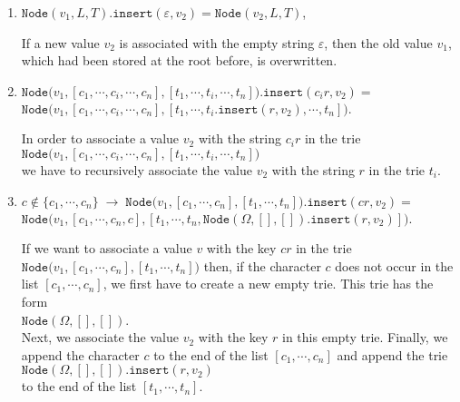 \begin{enumerate}
\item $\texttt{Node}(v_1,L,T).\texttt{insert}(\varepsilon, v_2) = \texttt{Node}(v_2,L,T)$,
  
      If a new value $v_2$ is associated with the empty string $\varepsilon$, then the old value
      $v_1$, which had been stored at the root before, is overwritten.
\item $\texttt{Node}\bigl(v_1,[c_1,\cdots,c_i,\cdots,c_n], [t_1,\cdots,t_i,\cdots,t_n]\bigr).\texttt{insert}(c_ir,v_2) =$ \\[0.2cm]
      \hspace*{1.3cm}  
      $\texttt{Node}\bigl(v_1,[c_1,\cdots,c_i,\cdots,c_n], [t_1,\cdots,t_i.\texttt{insert}(r,v_2),\cdots,t_n]\bigr)$.

      In order to associate a value $v_2$ with the string $c_ir$ in the trie
      \\[0.2cm]
      \hspace*{1.3cm}
      $\texttt{Node}\bigl(v_1,[c_1,\cdots,c_i,\cdots,c_n], [t_1,\cdots,t_i,\cdots,t_n]\bigr)$ 
      \\[0.2cm]
      we have to recursively associate the value $v_2$ with the string $r$ in the trie $t_i$.
\item $c \not\in\{c_1,\cdots,c_n\} \;\rightarrow\;\texttt{Node}\bigl(v_1,[c_1,\cdots,c_n], [t_1,\cdots,t_n]\bigr).\texttt{insert}(cr,v_2) =$ \\[0.2cm]
      \hspace*{1.3cm}  
      $\texttt{Node}\bigl(v_1,[c_1,\cdots,c_n,c], [t_1,\cdots,t_n,\texttt{Node}(\Omega,[],[]).\texttt{insert}(r,v_2)]\bigr)$.
      
      If we want to associate a value $v$ with the key $cr$ in the trie
      $\texttt{Node}\bigl(v_1,[c_1,\cdots,c_n], [t_1,\cdots,t_n]\bigr)$ then, if the character $c$
      does not occur in the list $[c_1,\cdots,c_n]$, we first have to create a new empty trie.
      This trie has the form \\[0.2cm]
      \hspace*{1.3cm} $\texttt{Node}(\Omega, [], [])$. \\[0.2cm]
      Next, we associate the value $v_2$ with the key $r$ in this empty trie.  Finally,
      we append the character $c$ to the end of the list $[c_1,\cdots,c_n]$ and append the trie
        \\[0.2cm] 
      \hspace*{1.3cm}
      $\texttt{Node}(\Omega, [], []).\texttt{insert}(r,v_2)$ 
      \\[0.2cm]
      to the end of the list $[t_1,\cdots,t_n]$.
\end{enumerate}


